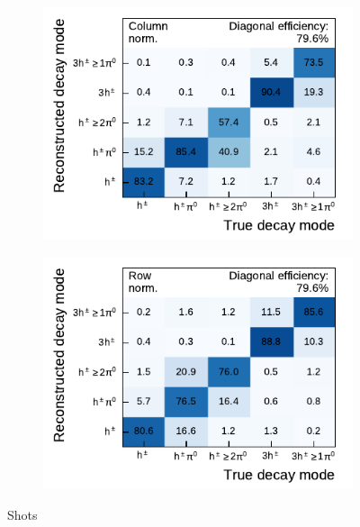 \begin{figure}[htb]
  \begin{subfigure}[t]{0.48\textwidth}
    \centering
    \includegraphics{./figures/decay_mode_classification/experiments/mig_mat_shots.pdf}
  \end{subfigure}\hfill
  \begin{subfigure}[t]{0.48\textwidth}
    \centering
    \includegraphics{./figures/decay_mode_classification/experiments/comp_mat_shots.pdf}
  \end{subfigure}
  \caption{Shots}
\end{figure}

